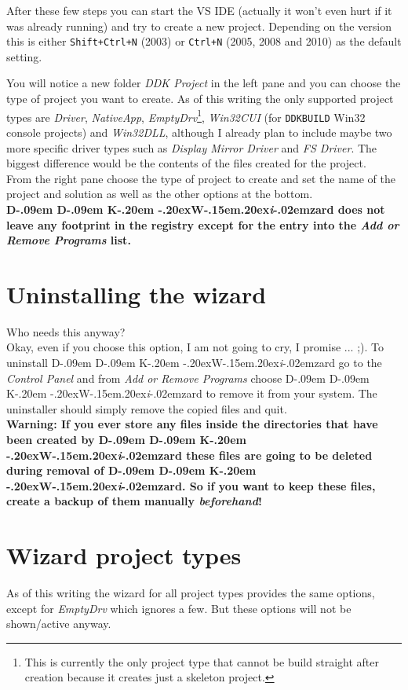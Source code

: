 \documentclass[a4paper,titlepage]{report}
\newcommand{\important}[1]{\textcolor[rgb]{0.90,0.00,0.00}{\textbf{#1}}}
\def\ddkwiz{D\kern-.09em D\kern-.09em K\kern-.20em \raise-.20ex\hbox{W}\kern-.15em\raise.20ex\hbox{\it{i}}\kern-.02em{zard}}
\begin{document}
After these few steps you can start the VS IDE (actually it won't even hurt if it
was already running) and try to create a new project. Depending on the version
this is either \texttt{Shift+Ctrl+N} (2003) or \texttt{Ctrl+N} (2005, 2008 and 2010)
as the default setting.

You will notice a new folder \emph{DDK Project} in the left pane and you
can choose the type of project you want to create. As of this writing the
only supported project types are \emph{Driver}, \emph{NativeApp}, \emph{EmptyDrv}\footnote{This
is currently the only project type that cannot be build straight after creation
because it creates just a skeleton project.}, \emph{Win32CUI} (for \texttt{DDKBUILD}
Win32 console projects) and \emph{Win32DLL}, although I already plan to include
maybe two more specific driver types such as \emph{Display Mirror Driver} and
\emph{FS Driver}. The biggest difference would be the contents of the files created
for the project.\\

From the right pane choose the type of project to create and set the name
of the project and solution as well as the other options at the bottom.\\

\important{\ddkwiz{} does not leave any footprint in the registry except for
the entry into the \emph{Add or Remove Programs} list.}

\section{Uninstalling the wizard}
Who needs this anyway?\\

Okay, even if you choose this option, I am not going to cry, I promise ... \textsf{;)}. To
uninstall \ddkwiz{} go to the \emph{Control Panel} and from \emph{Add or Remove Programs}
choose \ddkwiz{} to remove it from your system. The uninstaller should simply
remove the copied files and quit.\\

\important{Warning: If you ever store any files inside the directories that
have been created by \ddkwiz{} these files are going to be deleted during
removal of \ddkwiz{}. So if you want to keep these files, create a backup
of them manually \emph{beforehand}!}

\section{Wizard project types}
\label{sec:projtypes}
As of this writing the wizard for all project types provides the same options,
except for \emph{EmptyDrv} which ignores a few. But these options will not
be shown/active anyway.
\end{document}
